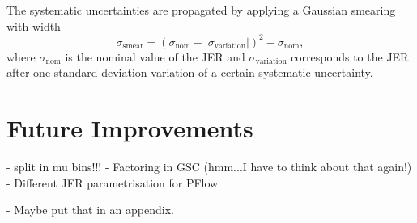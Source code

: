 The systematic uncertainties are propagated by applying a Gaussian smearing with width
\begin{equation}
    \sigma_{\text{smear}} =  \left( \sigma_{\text{nom}} - |\sigma_{\text{variation}}|   \right)^2  - \sigma_{\text{nom}},
\end{equation}
where $\sigma_{\text{nom}}$ is the nominal value of the JER and $\sigma_{\text{variation}}$ corresponds to the JER after one-standard-deviation variation of a certain systematic uncertainty.





\section{Future Improvements}

- split in mu bins!!!
- Factoring in GSC (hmm...I have to think about that again!)
- Different JER parametrisation for PFlow


- Maybe put that in an appendix.